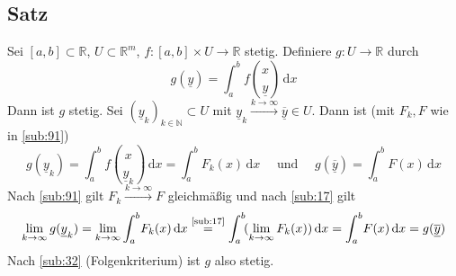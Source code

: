 \subsection[Satz: Stetigkeit einer per Integral definierten Funktion]{Satz} %
\label{sub:92}
Sei $[a,b] \subset \mathds{R}$, $U  \subset \mathds{R}^m$, $f : [a,b] \times U \to \mathds{R}$ stetig. Definiere $g : U  \to \mathds{R}$ durch 
\[
	g (\underline{y}) = \int_{a} ^{b} \! f \binom{x}{\underline{y}}  \, \mathrm{d}x  
\]
Dann ist $g$ stetig.
Sei $(\underline{y}_k)_{k \in \mathds{N}} \subset U$ mit $\underline{y}_k \xrightarrow{k \to \infty} \overline{\underline{y}} \in U $. Dann ist (mit $F_k, F$ wie in
\ref{sub:91}) 
\[
	  g(\underline{y}_k) = \int_{a} ^{b} \! f \binom{x}{\underline{y}_k}  \, \mathrm{d}x  = \int_{a} ^{b} \! F_k(x)  \, \mathrm{d}x  
	\quad  \text{ und } \quad g(\overline{\underline{y}} ) =  \int_{a} ^{b} \! F(x)  \, \mathrm{d}x 
\]
Nach \ref{sub:91} gilt $F_k \xrightarrow{k \to \infty} F$ gleichmäßig und nach \ref{sub:17} gilt 
\begin{align*}
	\lim_{ k \to \infty} g(\underline{y}_k) = \lim_{ k \to \infty} \int_{a} ^{b} \! F_k (x)  \, \mathrm{d}x  \stackrel{\text{\ref{sub:17}}}{=} \int_{a} ^{b} \! 
	(\lim_{ k \to \infty} F_k (x))  \, \mathrm{d}x = \int_{a} ^{b} \! F(x)  \, \mathrm{d}x  = g(\overline{\underline{y}} )
\end{align*}
Nach \ref{sub:32} (Folgenkriterium) ist $g$ also stetig. \bewende

